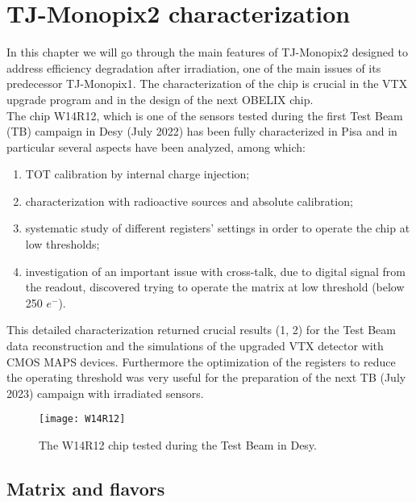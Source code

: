 
\chapter{TJ-Monopix2 characterization} \label{ch:TJ2}

In this chapter we will go through the main features of TJ-Monopix2 designed to address efficiency degradation after irradiation, one of the main issues of its predecessor TJ-Monopix1. The characterization of the chip is crucial in the VTX upgrade program and in the design of the next OBELIX chip.\\
The chip W14R12, which is one of the sensors tested during the first Test Beam (TB) campaign in Desy (July 2022) has been fully characterized in Pisa and in particular several aspects have been analyzed, among which:

\begin{enumerate}
\item TOT calibration by internal charge injection;
\item characterization with radioactive sources and absolute calibration;
\item systematic study of different registers' settings in order to operate the chip at low thresholds;
\item investigation of an important issue with cross-talk, due to digital signal from the readout, discovered trying to operate the matrix at low threshold (below 250 $e^{-}$).
\end{enumerate}

This detailed characterization returned crucial results (1, 2) for the Test Beam data reconstruction and the simulations of the upgraded VTX detector with CMOS MAPS devices. Furthermore the optimization of the registers to reduce the operating threshold was very useful for the preparation of the next TB (July 2023) campaign with irradiated sensors.


\begin{figure}[h!]
\centering
\texttt{[image: W14R12]}
\caption{The W14R12 chip tested during the Test Beam in Desy.}
\label{fig:w14r12}
\end{figure}



\section{Matrix and flavors}


